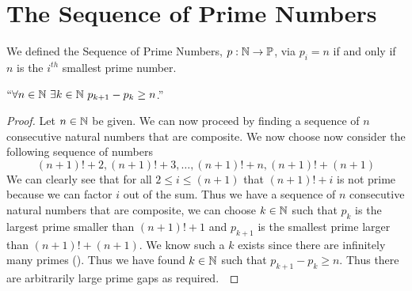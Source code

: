     \section{The Sequence of Prime Numbers}
        \begin{definition}
            We defined the Sequence of Prime Numbers, $p: \mathbb{N} \rightarrow \mathbb{P}$, via
            $p_i = n$ if and only if $n$ is the $i^{th}$ smallest prime number.
        \end{definition}
        \begin{theorem}
            $``\forall n \in \mathbb{N} \ \exists k \in \mathbb{N} \ p_{k + 1} - p_{k} \ge n$.''
        \end{theorem}
        \begin{proof}
            Let $n \in \mathbb{N}$ be given. We can now proceed by finding a sequence of $n$ consecutive
            natural numbers that are composite. We now choose now consider the following sequence of
            numbers
            \[
                (n + 1)! + 2, (n + 1)! + 3, \dots, (n + 1)! + n, (n + 1)! + (n + 1)
            \]
            We can clearly see that for all $2 \le i \le (n + 1)$ that $(n + 1)! + i$
            is not prime because we can factor $i$ out of the sum. Thus we have a sequence of $n$
            consecutive natural numbers that are composite, we can choose $k \in \mathbb{N}$ such
            that $p_k$ is the largest prime smaller than $(n + 1)! + 1$ and $p_{k + 1}$ is the
            smallest prime larger than $(n + 1)! + (n + 1)$. We know such a $k$ exists since there
            are infinitely many primes (). Thus we have found
            $k \in \mathbb{N}$ such that $p_{k + 1} - p_k \ge n$. Thus there are arbitrarily large
            prime gaps as required.~\QED
        \end{proof}
